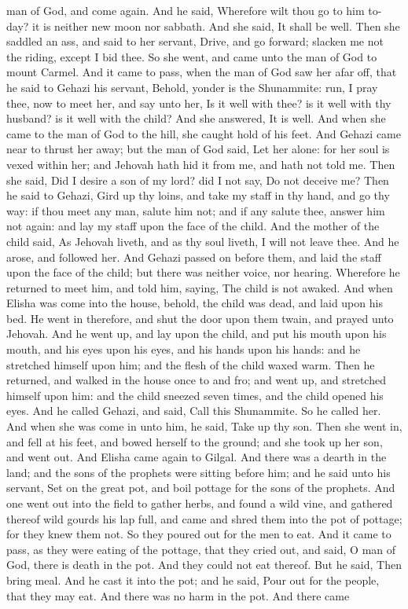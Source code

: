man of God, and come again. And he said, Wherefore wilt thou go to him to-day? it is neither new moon nor sabbath. And she said, It shall be well. Then she saddled an ass, and said to her servant, Drive, and go forward; slacken me not the riding, except I bid thee. So she went, and came unto the man of God to mount Carmel. And it came to pass, when the man of God saw her afar off, that he said to Gehazi his servant, Behold, yonder is the Shunammite: run, I pray thee, now to meet her, and say unto her, Is it well with thee? is it well with thy husband? is it well with the child? And she answered, It is well. And when she came to the man of God to the hill, she caught hold of his feet. And Gehazi came near to thrust her away; but the man of God said, Let her alone: for her soul is vexed within her; and Jehovah hath hid it from me, and hath not told me. Then she said, Did I desire a son of my lord? did I not say, Do not deceive me? Then he said to Gehazi, Gird up thy loins, and take my staff in thy hand, and go thy way: if thou meet any man, salute him not; and if any salute thee, answer him not again: and lay my staff upon the face of the child. And the mother of the child said, As Jehovah liveth, and as thy soul liveth, I will not leave thee. And he arose, and followed her. And Gehazi passed on before them, and laid the staff upon the face of the child; but there was neither voice, nor hearing. Wherefore he returned to meet him, and told him, saying, The child is not awaked.  And when Elisha was come into the house, behold, the child was dead, and laid upon his bed. He went in therefore, and shut the door upon them twain, and prayed unto Jehovah. And he went up, and lay upon the child, and put his mouth upon his mouth, and his eyes upon his eyes, and his hands upon his hands: and he stretched himself upon him; and the flesh of the child waxed warm. Then he returned, and walked in the house once to and fro; and went up, and stretched himself upon him: and the child sneezed seven times, and the child opened his eyes. And he called Gehazi, and said, Call this Shunammite. So he called her. And when she was come in unto him, he said, Take up thy son. Then she went in, and fell at his feet, and bowed herself to the ground; and she took up her son, and went out.  And Elisha came again to Gilgal. And there was a dearth in the land; and the sons of the prophets were sitting before him; and he said unto his servant, Set on the great pot, and boil pottage for the sons of the prophets. And one went out into the field to gather herbs, and found a wild vine, and gathered thereof wild gourds his lap full, and came and shred them into the pot of pottage; for they knew them not. So they poured out for the men to eat. And it came to pass, as they were eating of the pottage, that they cried out, and said, O man of God, there is death in the pot. And they could not eat thereof. But he said, Then bring meal. And he cast it into the pot; and he said, Pour out for the people, that they may eat. And there was no harm in the pot.  And there came 